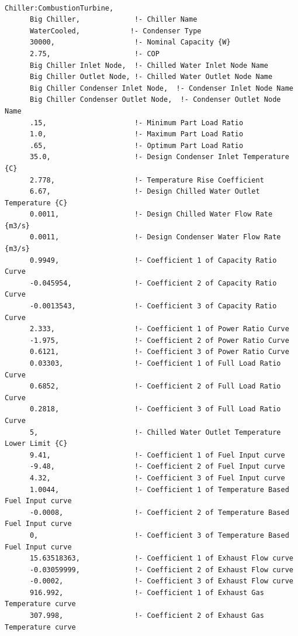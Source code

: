 \begin{lstlisting}

Chiller:CombustionTurbine,
      Big Chiller,             !- Chiller Name
      WaterCooled,            !- Condenser Type
      30000,                   !- Nominal Capacity {W}
      2.75,                    !- COP
      Big Chiller Inlet Node,  !- Chilled Water Inlet Node Name
      Big Chiller Outlet Node, !- Chilled Water Outlet Node Name
      Big Chiller Condenser Inlet Node,  !- Condenser Inlet Node Name
      Big Chiller Condenser Outlet Node,  !- Condenser Outlet Node Name
      .15,                     !- Minimum Part Load Ratio
      1.0,                     !- Maximum Part Load Ratio
      .65,                     !- Optimum Part Load Ratio
      35.0,                    !- Design Condenser Inlet Temperature {C}
      2.778,                   !- Temperature Rise Coefficient
      6.67,                    !- Design Chilled Water Outlet Temperature {C}
      0.0011,                  !- Design Chilled Water Flow Rate {m3/s}
      0.0011,                  !- Design Condenser Water Flow Rate {m3/s}
      0.9949,                  !- Coefficient 1 of Capacity Ratio Curve
      -0.045954,               !- Coefficient 2 of Capacity Ratio Curve
      -0.0013543,              !- Coefficient 3 of Capacity Ratio Curve
      2.333,                   !- Coefficient 1 of Power Ratio Curve
      -1.975,                  !- Coefficient 2 of Power Ratio Curve
      0.6121,                  !- Coefficient 3 of Power Ratio Curve
      0.03303,                 !- Coefficient 1 of Full Load Ratio Curve
      0.6852,                  !- Coefficient 2 of Full Load Ratio Curve
      0.2818,                  !- Coefficient 3 of Full Load Ratio Curve
      5,                       !- Chilled Water Outlet Temperature Lower Limit {C}
      9.41,                    !- Coefficient 1 of Fuel Input curve
      -9.48,                   !- Coefficient 2 of Fuel Input curve
      4.32,                    !- Coefficient 3 of Fuel Input curve
      1.0044,                  !- Coefficient 1 of Temperature Based Fuel Input curve
      -0.0008,                 !- Coefficient 2 of Temperature Based Fuel Input curve
      0,                       !- Coefficient 3 of Temperature Based Fuel Input curve
      15.63518363,             !- Coefficient 1 of Exhaust Flow curve
      -0.03059999,             !- Coefficient 2 of Exhaust Flow curve
      -0.0002,                 !- Coefficient 3 of Exhaust Flow curve
      916.992,                 !- Coefficient 1 of Exhaust Gas Temperature curve
      307.998,                 !- Coefficient 2 of Exhaust Gas Temperature curve

\end{lstlisting}

